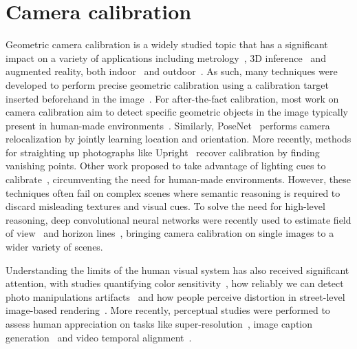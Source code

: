 \section{Camera calibration}


Geometric camera calibration is a widely studied topic that has a significant impact on a variety of applications including metrology~\cite{Criminisi2000}, 3D inference~\cite{Criminisi00,Fouhey2013} and augmented reality, both indoor~\cite{hedau-iccv-09,izadinia-cvpr-17} and outdoor~\cite{hoiem-cvpr-06}. As such, many techniques were developed to perform precise geometric calibration using a calibration target inserted beforehand in the image~\cite{Sturm1999,Zhang2002,Heikkila1997,Chen2004}. For after-the-fact calibration, most work on camera calibration aim to detect specific geometric objects in the image typically present in human-made environments~\cite{Rother2000,Melo2013}. Similarly, PoseNet~\cite{kendall-iccv-15} performs camera relocalization by jointly learning location and orientation. More recently, methods for straighting up photographs like Upright~\cite{Lee2014} recover calibration by finding vanishing points. Other work proposed to take advantage of lighting cues to calibrate~\cite{lalonde-ijcv-10,Workman2014}, circumventing the need for human-made environments. However, these techniques often fail on complex scenes where semantic reasoning is required to discard misleading textures and visual cues. To solve the need for high-level reasoning, deep convolutional neural networks were recently used to estimate field of view~\cite{Workman2015a} and horizon lines~\cite{Workman2016}, bringing camera calibration on single images to a wider variety of scenes.

Understanding the limits of the human visual system has also received significant attention, with studies quantifying color sensitivity~\cite{fairchild2013color}, how reliably we can detect photo manipulations artifacts~\cite{Farid2010} and how people perceive distortion in street-level image-based rendering~\cite{Vangorp2013}. More recently, perceptual studies were performed to assess human appreciation on tasks like super-resolution~\cite{ledig-cvpr-17}, image caption generation~\cite{vinyals-cvpr-15} and video temporal alignment~\cite{papazoglou-accv-16}. 

